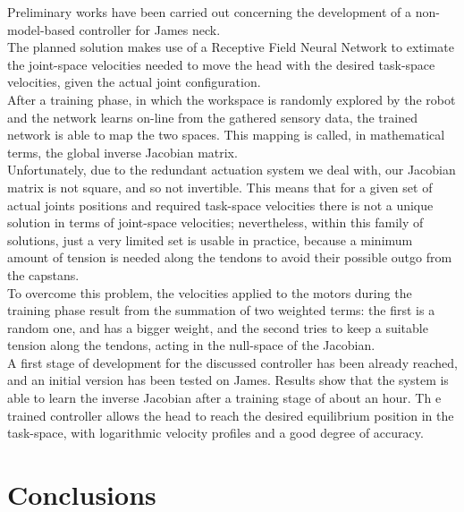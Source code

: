 \documentclass[9pt]{amsart}
\theoremstyle{definition}
\theoremstyle{remark}
\numberwithin{equation}{section}
\newcommand{\To}{\longrightarrow}
\newcommand{\A}{\mathcal{A}}
\begin{document}
Preliminary works have been carried out concerning the development of a non-model-based controller for James neck.\\The planned solution makes use of a Receptive Field Neural Network to extimate the joint-space velocities needed to move the head with the desired task-space velocities, given the actual joint configuration.\\After a training phase, in which the workspace is randomly explored by the robot and the network learns on-line from the gathered sensory data, the trained network is able to map the two spaces. This mapping is called, in mathematical terms, the global inverse Jacobian matrix.\\Unfortunately, due to the redundant actuation system we deal with, our Jacobian matrix is not square, and so not invertible. This means that for a given set of actual joints positions and required task-space velocities there is not a unique solution in terms of joint-space velocities; nevertheless, within this family of solutions, just a very limited set is usable in practice, because a minimum amount of tension is needed along the tendons to avoid their possible outgo from the capstans.\\To overcome this problem, the velocities applied to the motors during the training phase result from the summation of two weighted terms: the first is a random one, and has a bigger weight, and the second tries to keep a suitable tension along the tendons, acting in the null-space of the Jacobian.\\A first stage of development for the discussed controller has been already reached, and an initial version has been tested on James. Results show that the system is able to learn the inverse Jacobian after a training stage of about an hour. Th e trained controller allows the head to reach the desired equilibrium position in the task-space, with logarithmic velocity profiles and a good degree of accuracy.


\section{Conclusions} \label{Sec:Conclusions}







\end{document}
